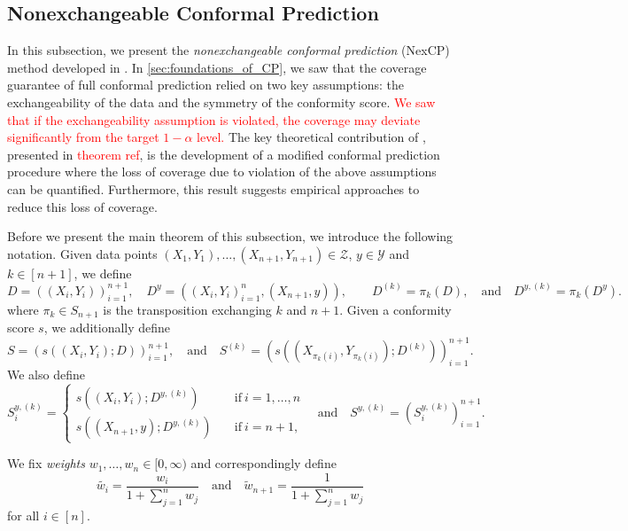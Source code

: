 \documentclass[11pt, titlepage]{article} %
\numberwithin{equation}{section}
\theoremstyle{definition}
\numberwithin{theorem}{section}
\numberwithin{lemma}{section}
\numberwithin{corollary}{section}
\numberwithin{proposition}{section}
\numberwithin{definition}{section}
\numberwithin{remark}{section}
\begin{document}
\subsection{Nonexchangeable Conformal Prediction}


In this subsection, we present the \textit{nonexchangeable conformal prediction} (NexCP) method developed in \cite{barber2023conformalbeyondexch}. In \cref{sec:foundations_of_CP}, we saw that the coverage guarantee of full conformal prediction relied on two key assumptions: the exchangeability of the data and the symmetry of the conformity score. \textcolor{red}{We saw that if the exchangeability assumption is violated, the coverage may deviate significantly from the target \(1-\alpha\) level.} The key theoretical contribution of \cite{barber2023conformalbeyondexch}, presented in \textcolor{red}{theorem ref}, is the development of a modified conformal prediction procedure where the loss of coverage due to violation of the above assumptions can be quantified. Furthermore, this result suggests empirical approaches to reduce this loss of coverage. \vskip5pt

\noindent
Before we present the main theorem of this subsection, we introduce the following notation. Given data points \((X_1, Y_1), \ldots, (X_{n+1}, Y_{n+1}) \in \mathcal{Z}\), \(y \in \mathcal{Y}\) and \(k \in [n+1]\), we define \[D = ((X_i, Y_i))_{i=1}^{n+1}, \quad D^{y} = ((X_i, Y_i)_{i=1}^n, (X_{n+1}, y)), \quad \quad D^{(k)} = \pi_k(D), \quad \mathrm{and} \quad D^{y, (k)} = \pi_k(D^{y}). \] where \(\pi_k \in S_{n+1}\) is the transposition exchanging \(k\) and \(n+1\). Given a conformity score \(s\), we additionally define \[S = (s((X_i, Y_i); D))_{i=1}^{n+1}, \quad \mathrm{and} \quad S^{(k)} = ( s(( X_{\pi_k(i)}, Y_{\pi_k(i)} ); D^{(k)}) )_{i=1}^{n+1}.\] We also define \[S_i^{y, (k)} = \begin{cases}
    s(( X_i, Y_i ); D^{y, (k)}) \quad &\mathrm{if} \ i = 1, \ldots, n \\
    s(( X_{n+1}, y ); D^{y, (k)}) \quad &\mathrm{if} \ i = n+1,
\end{cases} \quad \mathrm{and} \quad S^{y, (k)} = (S_i^{y,(k)})_{i=1}^{n+1}.\]

\noindent
We fix \textit{weights} \(w_1, \ldots, w_{n} \in [0, \infty)\) and correspondingly define \begin{equation}
    \tilde{w_i} = \frac{w_i}{1+\sum_{j=1}^n w_j} \quad \mathrm{and} \quad \tilde{w}_{n+1} = \frac{1}{1+\sum_{j=1}^n w_j}
\label{eqn:nexcp_weights_defn}
\end{equation} for all \(i \in [n]\). \vskip5pt
\end{document}
